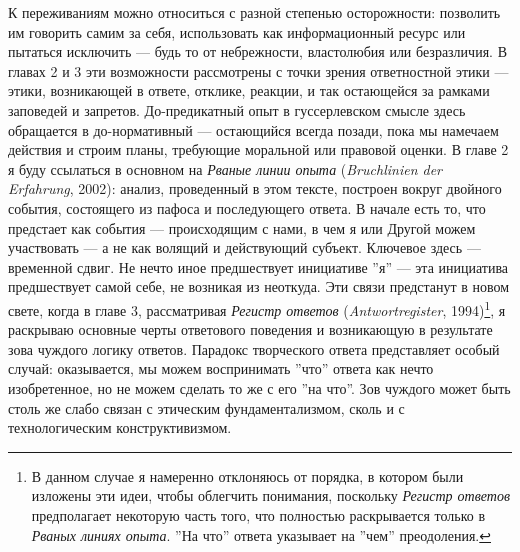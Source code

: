 \documentclass[12pt]{book}
\begin{document}
К переживаниям можно относиться с разной степенью осторожности: позволить им говорить самим за себя, использовать как информационный ресурс или пытаться исключить --- будь то от небрежности, властолюбия или безразличия. В главах 2 и 3 эти возможности рассмотрены с точки зрения ответностной этики --- этики, возникающей в ответе, отклике, реакции, и так остающейся за рамками заповедей и запретов. До-предикатный опыт в гуссерлевском смысле здесь обращается в до-нормативный --- остающийся всегда позади, пока мы намечаем действия и строим планы, требующие моральной или правовой оценки. В главе 2 я буду ссылаться в основном на \textit{Рваные линии опыта} (\textit{Bruchlinien der Erfahrung}, 2002): анализ, проведенный в этом тексте, построен вокруг двойного события, состоящего из пафоса и последующего ответа. В начале есть то, что предстает как события --- происходящим с нами, в чем я или Другой можем участвовать --- а не как волящий и действующий субъект. Ключевое здесь --- временной сдвиг. Не нечто иное предшествует инициативе ''я'' --- эта инициатива предшествует самой себе, не возникая из неоткуда. Эти связи предстанут в новом свете, когда в главе 3, рассматривая \textit{Регистр ответов} (\textit{Antwortregister}, 1994)\footnote{В данном случае я намеренно отклоняюсь от порядка, в котором были изложены эти идеи, чтобы облегчить понимания, поскольку \textit{Регистр ответов} предполагает некоторую часть того, что полностью раскрывается только в \textit{Рваных линиях опыта}. ''На что'' ответа указывает на ''чем'' преодоления.}, я раскрываю основные черты ответового поведения и возникающую в результате зова чуждого логику ответов. Парадокс творческого ответа представляет особый случай: оказывается, мы можем воспринимать ''что'' ответа как нечто изобретенное, но не можем сделать то же с его ''на что''. Зов чуждого может быть столь же слабо связан с этическим фундаментализмом, сколь и с технологическим конструктивизмом.
\end{document}
